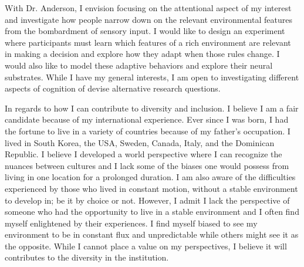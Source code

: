 \documentclass[12pt]{article}
\begin{document}
	With Dr. Anderson, I envision focusing on the attentional aspect of my interest and investigate how people narrow down on the relevant environmental features from the bombardment of sensory input. I would like to design an experiment where participants must learn which features of a rich environment are relevant in making a decision and explore how they adapt when those rules change. I would also like to model these adaptive behaviors and explore their neural substrates. While I have my general interests, I am open to investigating different aspects of cognition of devise alternative research questions. 
	
	In regards to how I can contribute to diversity and inclusion. I believe I am a fair candidate because of my international experience. Ever since I was born, I had the fortune to live in a variety of countries because of my father’s occupation. I lived in South Korea, the USA, Sweden, Canada, Italy, and the Dominican Republic. I believe I developed a world perspective where I can recognize the nuances between cultures and I lack some of the biases one would possess from living in one location for a prolonged duration. I am also aware of the difficulties experienced by those who lived in constant motion, without a stable environment to develop in; be it by choice or not. However, I admit I lack the perspective of someone who had the opportunity to live in a stable environment and I often find myself enlightened by their experiences. I find myself biased to see my environment to be in constant flux and unpredictable while others might see it as the opposite. While I cannot place a value on my perspectives, I believe it will contributes to the diversity in the institution.
	
\end{document}
